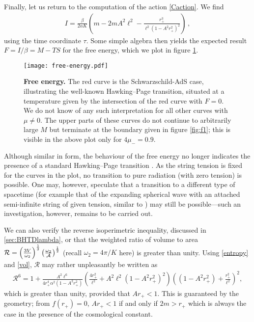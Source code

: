\documentclass[
twoside,
openright,
frontopenright,
]{dmathesis}
\begin{document}
Finally, let us return to the computation of the action \eqref{Caction}.
We find
\begin{align}
I = \frac{\beta}{2\alpha K} \left( m - 2mA^2\ell^2
- \frac{r_+^3}{\ell^2(1-A^2r_+^2)^2} \right)\,,
\label{Caction}
\end{align}
using the time coordinate $\tau$. Some simple algebra then yields the
expected result $F=I/\beta=M-TS$
for the free energy, which we plot in figure \ref{fig:FE}.
\begin{figure}[tbp]
\centering
\texttt{[image: free-energy.pdf]}
\caption{\textbf{Free energy.}
The red curve is the Schwarzschild-AdS case, illustrating the
well-known Hawking--Page transition,  situated at a temperature
given by the intersection of the red curve with $F=0$. We do
not know of any such interpretation for all other curves with $\mu\neq 0$.
The upper parts of these curves do not continue to arbitrarily large $M$
but terminate at the boundary given in figure
\ref{fig:f1}; this is visible in the above plot only for $4\mu_- =0.9$.   }
\label{fig:FE}
\end{figure}

Although similar in form, the behaviour of the free energy no longer indicates
the presence of a standard Hawking--Page transition \cite{Hawking:1982dh}.
As the string tension is fixed for the curves in the plot, no transition to
pure radiation (with zero tension) is possible. One may, however, speculate that
a transition to a different type of spacetime (for example {that of the expanding spherical wave with an attached semi-infinite string of given tension, similar to} \cite{Podolsky:2004bk})
may still be possible---such an investigation, however, remains to be carried out.

We can also verify the reverse isoperimetric inequality, discussed in \cref{sec:BHTDlambda}, or that the weighted ratio of volume to
area $\mathcal{R}=\left( \frac{3{V}}{\omega _{2}}\right)^{\frac{1}{3}}
\left(\frac{\omega _{2}}{{\cal A}}\right) ^{\frac{1}{2}}$ (recall $\omega_2=4\pi/K$
here) is greater than unity. Using \cref{entropy} and \cref{vol}, $\mathcal{R}$
may rather unpleasantly be written as
\begin{align}
  \mathcal{R}^6 = 1 + \frac{A^2\ell^6}{4r_+^4\alpha^2(1-A^2r_+^2)}
  \left(\frac{4r_+^2}{\ell^2} 
  + A^2 \ell^2 (1-A^2 r_+^2)^2\right)
  \left((1-A^2r_+^2)+\frac{r_+^2}{\ell^2}\right)^2, 
\end{align}
which is greater than unity, provided that $Ar_+<1$. This is guaranteed by the
geometry; from $f(r_+) = 0$, $Ar_+<1$ if and only if $2m > r_+$ which is always
the case in the presence of the cosmological constant.
\end{document}
